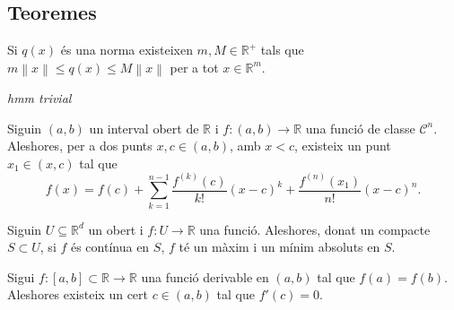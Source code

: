\documentclass[../Apunts.tex]{subfiles}
\begin{document}
	\subsection{Teoremes}
	\begin{theorem}
		\label{thm:Equivalència de normes}
		Si \(q(x)\) és una norma existeixen \(m,M\in\mathbb{R}^{+}\) tals que \(m\left\lVert x\right\rVert\leq q(x)\leq M\left\lVert x\right\rVert\) per a tot \(x\in\mathbb{R}^{m}\).
	\end{theorem}
	\begin{theorem}
		\label{Teorema del Valor Mig}\label{thm:TVM}
		\emph{hmm trivial}
	\end{theorem}
	\begin{theorem}
		\label{thm:Desigualtat de C-S}
	\end{theorem}
	\begin{theorem}%
		\label{thm:Teorema de Taylor} %
		Siguin \((a,b)\) un interval obert de \(\mathbb{R}\) i \(f\colon(a,b)\rightarrow\mathbb{R}\) una funció de classe \(\mathcal{C}^{n}\). Aleshores, per a dos punts \(x,c\in(a,b)\), amb \(x<c\), existeix un punt \(x_{1}\in(x,c)\) tal que
		\[f(x)=f(c)+\sum_{k=1}^{n-1}\frac{f^{(k)}(c)}{k!}(x-c)^{k}+\frac{f^{(n)}(x_{1})}{n!}(x-c)^{n}.\]
	\end{theorem}
	\begin{theorem}
		\label{thm:Weierstrass màxims i mínims múltiples variables}
		Siguin \(U\subseteq\mathbb{R}^{d}\) un obert i \(f\colon U\to\mathbb{R}\) una funció. Aleshores, donat un compacte \(S\subset U\), si \(f\) és contínua en \(S\), \(f\) té un màxim i un mínim absoluts en \(S\).
	\end{theorem}
	\begin{theorem}
		\label{thm:sandvitx}
	\end{theorem}
	\begin{theorem}
		\label{thm:Teorema de Rolle}
		Sigui \(f\colon[a,b]\subset\mathbb{R}\longrightarrow\mathbb{R}\) una funció derivable en \((a,b)\) tal que \(f(a)=f(b)\). Aleshores existeix un cert \(c\in(a,b)\) tal que \(f'(c)=0\).
	\end{theorem}
\end{document}
